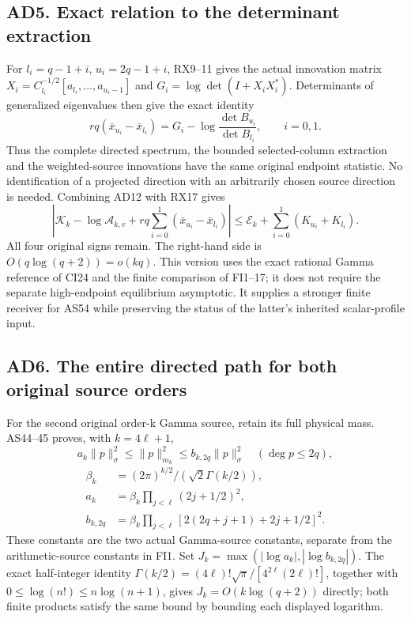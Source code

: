 \documentclass[11pt]{article}
\begin{document}
\subsection{AD5. Exact relation to the determinant extraction}\label{ad5.-exact-relation-to-the-determinant-extraction}

For \(l_i=q-1+i\), \(u_i=2q-1+i\), RX9--11 gives the actual innovation matrix \(X_i=C_{l_i}^{-1/2}[a_{l_i},\ldots,a_{u_i-1}]\) and \(G_i=\log\det(I+X_iX_i^*)\). Determinants of generalized eigenvalues then give the exact identity \[
rq(\bar x_{u_i}-\bar x_{l_i})
=G_i-\log\frac{\det B_{u_i}}{\det B_{l_i}},
\qquad i=0,1.
\tag{AD12}
\] Thus the complete directed spectrum, the bounded selected-column extraction and the weighted-source innovations have the same original endpoint statistic. No identification of a projected direction with an arbitrarily chosen source direction is needed. Combining AD12 with RX17 gives \[
\left|\mathcal K_k-\log\mathcal A_{k,v}
+rq\sum_{i=0}^1(\bar x_{u_i}-\bar x_{l_i})\right|
\le\mathcal E_k+\sum_{i=0}^1(K_{u_i}+K_{l_i}).
\tag{AD13}
\] All four original signs remain. The right-hand side is \(O(q\log(q+2))=o(kq)\). This version uses the exact rational Gamma reference of CI24 and the finite comparison of FI1--17; it does not require the separate high-endpoint equilibrium asymptotic. It supplies a stronger finite receiver for AS54 while preserving the status of the latter's inherited scalar-profile input.

\subsection{AD6. The entire directed path for both original source orders}\label{ad6.-the-entire-directed-path-for-both-original-source-orders}

For the second original order-k Gamma source, retain its full physical mass. AS44--45 proves, with \(k=4\ell+1\), \[
a_k\|p\|_\sigma^2\le\|p\|_{m_k}^2\le b_{k,2q}\|p\|_\sigma^2
\quad(\deg p\le2q),
\] \[
\begin{aligned}
\beta_k&=(2\pi)^{k/2}/(\sqrt2\Gamma(k/2)),\\
a_k&=\beta_k\prod_{j<\ell}(2j+1/2)^2,\\
b_{k,2q}&=\beta_k\prod_{j<\ell}[2(2q+j+1)+2j+1/2]^2.
\end{aligned}
\] These constants are the two actual Gamma-source constants, separate from the arithmetic-source constants in FI1. Set \(J_k=\max(|\log a_k|,|\log b_{k,2q}|)\). The exact half-integer identity \(\Gamma(k/2)=(4\ell)!\sqrt\pi/[4^{2\ell}(2\ell)!]\), together with \(0\le\log(n!)\le n\log(n+1)\), gives \(J_k=O(k\log(q+2))\) directly; both finite products satisfy the same bound by bounding each displayed logarithm.
\end{document}
